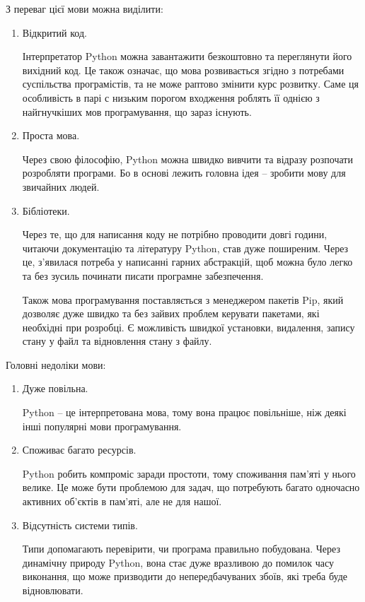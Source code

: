 \documentclass[a4paper,14pt]{extreport}
\begin{document}
        З переваг цієї мови можна виділити:
        \begin{enumerate}
            \item Відкритий код.

            Інтерпретатор Python можна завантажити безкоштовно та переглянути його вихідний код. Це також означає, що мова розвивається згідно з потребами суспільства програмістів, та не може раптово змінити курс розвитку. Саме ця особливість в парі с низьким порогом входження роблять її однією з найгнучкіших мов програмування, що зараз існують.

            \item Проста мова.

            Через свою філософію, Python можна швидко вивчити та відразу розпочати розробляти програми. Бо в основі лежить головна ідея -- зробити мову для звичайних людей.

            \item Бібліотеки.

            Через те, що для написання коду не потрібно проводити довгі години, читаючи документацію та літературу Python, став дуже поширеним. Через це, з'явилася потреба у написанні гарних абстракцій, щоб можна було легко та без зусиль починати писати програмне забезпечення.
            
            Також мова програмування поставляється з менеджером пакетів Pip, який дозволяє дуже швидко та без зайвих проблем керувати пакетами, які необхідні при розробці. Є можливість швидкої установки, видалення, запису стану у файл та відновлення стану з файлу.
        \end{enumerate}

        Головні недоліки мови:
        \begin{enumerate}
            \item Дуже повільна.

            Python -- це інтерпретована мова, тому вона працює повільніше, ніж деякі інші популярні мови програмування.

            \item Споживає багато ресурсів.

            Python робить компроміс заради простоти, тому споживання пам'яті у нього велике. Це може бути проблемою для задач, що потребують багато одночасно активних об'єктів в пам'яті, але не для нашої.

            \item Відсутність системи типів.

            Типи допомагають перевірити, чи програма правильно побудована. Через динамічну природу Python, вона стає дуже вразливою до помилок часу виконання, що може призводити до непередбачуваних збоїв, які треба буде відновлювати.
        \end{enumerate}
\end{document}
